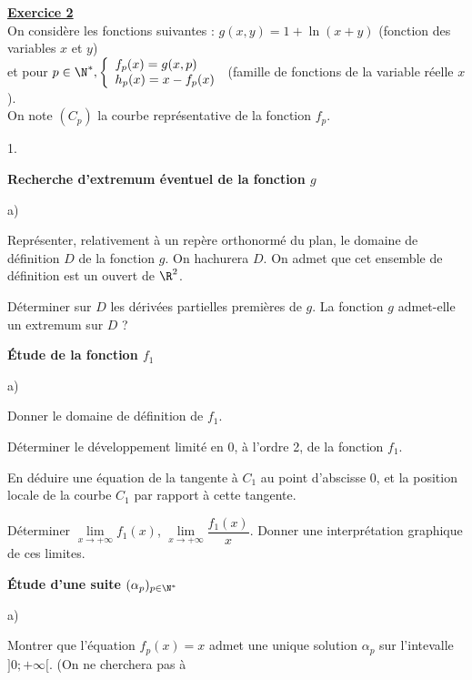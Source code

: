 \documentclass[11pt]{article}%
\begin{document}
\newpage

\underline{\bf Exercice 2}\\

On considère les fonctions suivantes :
$g(x,y) = 1 + \ln(x + y) $ (fonction des variables $x$ et $y$)\\
et pour $p\in \N^*, \left\{ 
\begin{array}{ll}
 f_{p}(x) = g(x,p) \\
h_{p}(x) = x-f_{p}(x)
\end{array}
\right.$ (famille de fonctions de la variable réelle $x$).\\
On note $(C_{p})$ la courbe représentative de la fonction $f_{p}$.

\begin{noliste}{1.}
 \setlength{\itemsep}{4mm}
\item {\bf Recherche d'extremum éventuel de la fonction $g$}
\begin{noliste}{a)}
 \setlength{\itemsep}{2mm}
\item Représenter, relativement à un repère orthonormé du plan, le
domaine de définition $D$ de la fonction $g$. On hachurera $D$. On
admet que cet ensemble de définition est un ouvert de $\R^{2}$.
\item Déterminer sur $D$ les dérivées partielles premières de $g$. La
fonction $g$ admet-elle un extremum sur $D$ ?
\end{noliste}
\item {\bf Étude de la fonction $f_{1}$}
\begin{noliste}{a)}
 \setlength{\itemsep}{2mm}
\item Donner le domaine de définition de $f_{1}$.
\item Déterminer le développement limité en 0, à l'ordre 2, de la
fonction $f_{1}$.
\item En déduire une équation de la tangente à $C_{1}$ au point
d'abscisse 0, et la position locale de la courbe $C_{1}$ par rapport à
cette tangente.
\item Déterminer $\underset{x\to + \infty}{\lim}f_{1}(x)$,
$\underset{x\to + \infty}{\lim}\dfrac{f_{1}(x)}{x}$. Donner une
interprétation graphique de ces limites.
\end{noliste}
\item {\bf Étude d'une suite $(\alpha_{p})_{p\in \N^*}$}
\begin{noliste}{a)}
 \setlength{\itemsep}{2mm}
\item Montrer que l'équation $f_{p}(x) = x$ admet une unique solution
$\alpha_{p}$ sur l'intevalle $]0; + \infty[$. (On ne cherchera pas à

\end{noliste}
\end{noliste}
\end{document}
